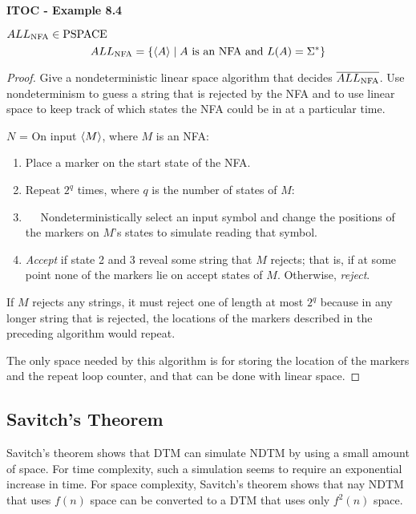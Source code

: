\label{lang:ALLNFA_PSAPCE}
\begin{shaded}
\textbf{ITOC - Example 8.4}

\medskip
$ALL_{\text{NFA}} \in \text{PSPACE}$
\[
ALL_{\text{NFA}} = \{\langle{A}\rangle \mid A \text{ is an NFA and } L(A) = \Sigma^* \}
\]
\end{shaded} 

\begin{mdframed}
\begin{proof}
Give a nondeterministic linear space algorithm that decides $\overline{ALL_{\text{NFA}}}$. Use nondeterminism to guess a string that is rejected by the NFA and to use linear space to keep track of which states the NFA could be in at a particular time.

\medskip
$N$ = On input $\langle{M}\rangle$, where $M$ is an NFA:
\begin{enumerate}
\item Place a marker on the start state of the NFA.
\item Repeat $2^q$ times, where $q$ is the number of states of $M$:
\item $\quad$ Nondeterministically select an input symbol and change the positions of the markers on $M$'s states to simulate reading that symbol.
\item \textit{Accept} if state 2 and 3 reveal some string that $M$ rejects; that is, if at some point none of the markers lie on accept states of $M$. Otherwise, \textit{reject}.
\end{enumerate}

If $M$ rejects any strings, it must reject one of length at most $2^q$ because in any longer string that is rejected, the locations of the markers described in the preceding algorithm would repeat.

The only space needed by this algorithm is for storing the location of the markers and the repeat loop counter, and that can be done with linear space.
\end{proof}
\end{mdframed}

\subsection{Savitch's Theorem}

Savitch's theorem shows that DTM can simulate NDTM by using a small amount of space. For time complexity, such a simulation seems to require an exponential increase in time. For space complexity, Savitch's theorem shows that nay NDTM that uses $f(n)$ space can be converted to a DTM that uses only $f^2(n)$ space.


